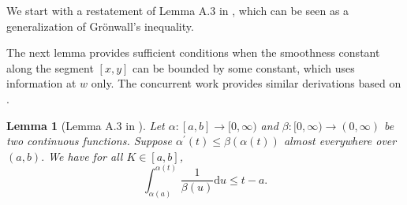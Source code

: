 \documentclass[a4paper,11pt]{article}
\newcommand{\diff}{\mathrm{d}}
\newcommand{\1}{\mathbbm{1}}
\theoremstyle{plain}
\newtheorem{lemma}{Lemma}
\begin{document}
We start with a restatement of Lemma A.3 in \citet{li2023convex}, which can be seen as a generalization of Gr{\"o}nwall’s inequality.

The next lemma provides sufficient conditions when the smoothness constant along the segment $[x,y]$ can be bounded by some constant, which uses information at $w$ only. The concurrent work \citet{liu2025theoretical} provides similar derivations based on \citet{li2023convex}.

\begin{lemma}[Lemma A.3 in \cite{li2023convex}]\label{lem:lemmaA3} Let $\alpha\colon [a,b] \to [0, \infty)$ and $\beta\colon [0,\infty) \to (0,\infty)$ be two continuous functions. Suppose $\alpha^\prime(t) \le \beta(\alpha(t))$ almost everywhere over $(a,b).$  We have for all $K\in[a,b]$,
\[
\int_{\alpha(a)}^{\alpha(t)} \frac{1}{\beta(u)}\diff u \le t-a.
\]
    
\end{lemma}
\end{document}
